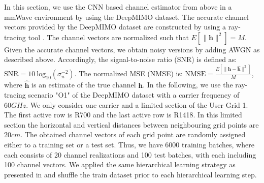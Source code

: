 \documentclass[12pt, draftclsnofoot, onecolumn]{IEEEtran}
\begin{document}
In this section, we use the CNN based channel estimator from above in a mmWave environment by using the DeepMIMO dataset. The accurate channel vectors provided by the DeepMIMO dataset are constructed by using a ray-tracing tool \cite{Remcom}. The channel vectors are normalized such that $E[\| \mathbf{h} \|^2] = M$. Given the accurate channel vectors, we obtain noisy versions by adding AWGN as described above. Accordingly, the signal-to-noise ratio (SNR) is defined as: $\text{SNR} = 10\ \text{log}_{10}({ \sigma_n^{-2}})$. The normalized MSE (NMSE) is: $\text{NMSE} = \frac{E[\| \mathbf{h} - \hat{\mathbf{h}} \|^2]}{M}$, where $\hat{\mathbf{h}}$ is an estimate of the true channel ${\mathbf{h}}$. In the following, we use the ray-tracing scenario "O1" of the DeepMIMO dataset with a carrier frequency of $60\si{GHz}$. We only consider one carrier and a limited section of the User Grid 1. The first active row is R700 and the last active row is R1418. In this limited section the horizontal and vertical distances between neighbouring grid points are $20\si{cm}$. The obtained channel vectors of each grid point are randomly assigned either to a training set or a test set. Thus, we have 6000 training batches, where each consists of 20 channel realizations and 100 test batches, with each including 100 channel vectors. We applied the same hierarchical learning strategy as presented in \cite{Neumann} and shuffle the train dataset prior to each hierarchical learning step.
\end{document}
